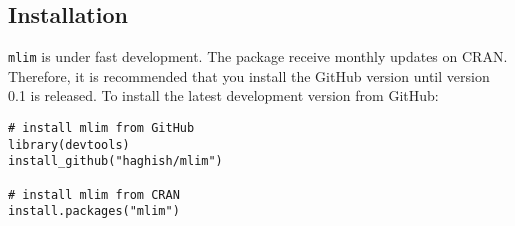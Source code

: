 \subsection{Installation}

\texttt{mlim} is under fast development. The package receive monthly updates on CRAN. Therefore, it is recommended that you install the GitHub version until version 0.1 is released. To install the latest development version from GitHub:


\begin{listing}[h]
\begin{verbatim}
# install mlim from GitHub
library(devtools)
install_github("haghish/mlim")

# install mlim from CRAN
install.packages("mlim")
\end{verbatim}
\label{listing:r}
\end{listing}


